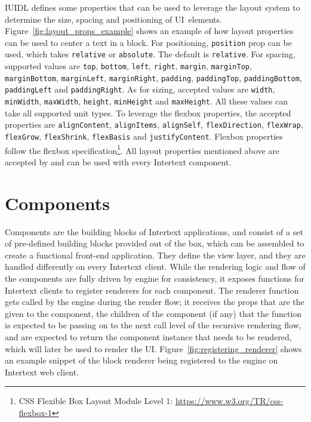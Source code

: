 IUIDL defines some properties that can be used to leverage the layout system to determine the size, spacing and positioning of UI~elements. Figure~\ref{fig:layout_props_example} shows an example of how layout properties can be used to center a text in a block. For positioning, \texttt{position} prop can be used, which takes \texttt{relative} or \texttt{absolute}. The default is \texttt{relative}. For spacing, supported values are \texttt{top}, \texttt{bottom}, \texttt{left}, \texttt{right}, \texttt{margin}, \texttt{marginTop}, \texttt{marginBottom}, \texttt{marginLeft}, \texttt{marginRight}, \texttt{padding}, \texttt{paddingTop}, \texttt{paddingBottom}, \texttt{paddingLeft} and \newline \texttt{paddingRight}. As for sizing, accepted values are \texttt{width}, \texttt{minWidth}, \texttt{maxWidth}, \texttt{height}, \texttt{minHeight} and \texttt{maxHeight}. All these values can take all supported unit types. To leverage the flexbox properties, the accepted properties are \texttt{alignContent}, \texttt{alignItems}, \texttt{alignSelf}, \texttt{flexDirection}, \texttt{flexWrap}, \texttt{flexGrow}, \texttt{flexShrink}, \texttt{flexBasis} and \texttt{justifyContent}. Flexbox properties follow the flexbox specification\footnote{CSS Flexible Box Layout Module Level 1: \url{https://www.w3.org/TR/css-flexbox-1}}. All layout properties mentioned above are accepted by and can be used with every Intertext component.

\section{Components}

Components are the building blocks of Intertext applications, and consist of a set of pre-defined building blocks provided out of the box, which can be assembled to create a functional front-end application. They define the view layer, and they are handled differently on every Intertext client. While the rendering logic and flow of the components are fully driven by engine for consistency, it exposes functions for Intertext clients to register renderers for each component. The renderer function gets called by the engine during the render flow; it receives the props that are the given to the component, the children of the component (if any) that the function is expected to be passing on to the next call level of the recursive rendering flow, and are expected to return the component instance that needs to be rendered, which will later be used to render the UI. Figure~\ref{fig:registering_renderer} shows an example snippet of the block renderer being registered to the engine on Intertext web client.

